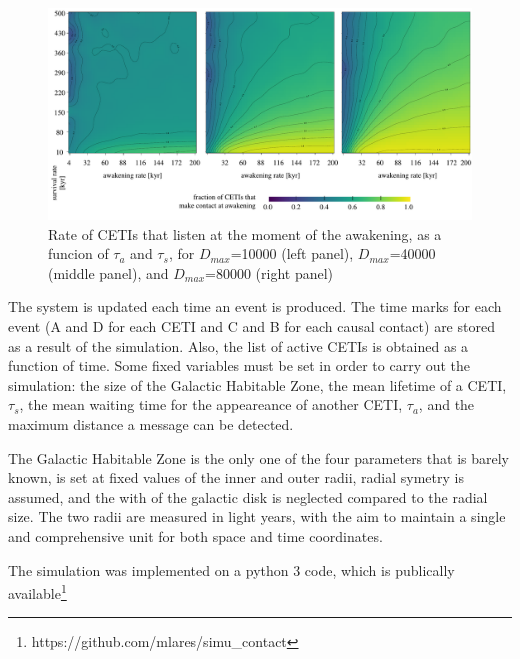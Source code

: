 \documentclass[crop]{CSLB}%
\begin{document}
  
\begin{figure} %
   \centering
   \includegraphics[width=\textwidth]{matrix_2.pdf}
   \caption{Rate of CETIs that listen at the moment of the
   awakening, as a funcion of $\tau_a$ and $\tau_s$, for
   $D_{max}$=10000 (left panel),
   $D_{max}$=40000 (middle panel), and
   $D_{max}$=80000 (right panel)}
   \label{F_C_at_A}
\end{figure}
                         

The system is updated each time an event is produced.
%
The time marks for each event (A and D for each CETI and C and B for each causal
contact) are stored as a result of the simulation.
%
Also, the list of active CETIs is obtained as a function of time.
%
Some fixed variables must be set in order to carry out the simulation: the size
of the Galactic Habitable Zone, the mean lifetime of a CETI, $\tau_s$, the mean
waiting time for the appeareance of another CETI, $\tau_a$, and the maximum
distance a message can be detected.



The Galactic Habitable Zone is the only one of the four parameters that is
barely known, is set at fixed values of the inner and outer radii, radial
symetry is assumed, and the with of the galactic disk is neglected compared to
the radial size.
%
The two radii are measured in light years, with the aim to maintain a single and
comprehensive unit for both space and time coordinates. 

The simulation was implemented on a python 3 code, which is publically
available\footnote{https://github.com/mlares/simu\_contact}



                   
\end{document}
